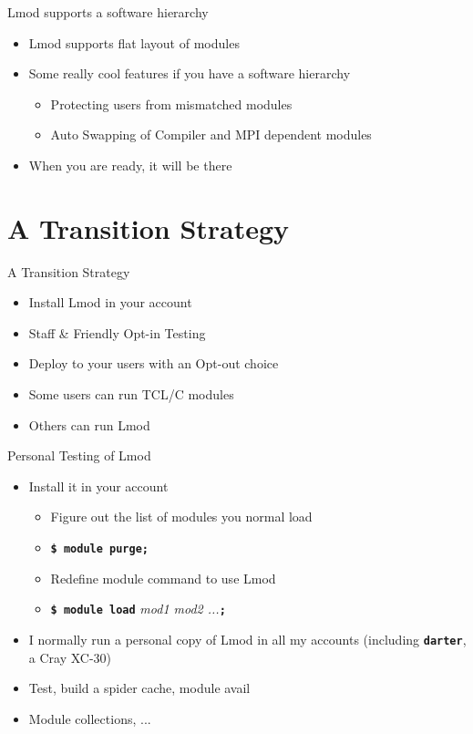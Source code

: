 \documentclass{beamer}
\begin{document}
\begin{frame}{Lmod supports a software hierarchy}
  \begin{itemize}
    \item Lmod supports flat layout of modules
    \item Some really cool features if you have a software hierarchy
      \begin{itemize}
        \item Protecting users from mismatched modules
        \item Auto Swapping of Compiler and MPI dependent modules
      \end{itemize}
    \item When you are ready, it will be there
  \end{itemize}
\end{frame}

\section{A Transition Strategy}

\begin{frame}{A Transition Strategy}
  \begin{itemize}
    \item Install Lmod in your account
    \item Staff \& Friendly Opt-in Testing
    \item Deploy to your users with an Opt-out choice
    \item Some users can run TCL/C modules
    \item Others can run Lmod
  \end{itemize}
\end{frame}

\begin{frame}{Personal Testing of Lmod}
  \begin{itemize}
    \item Install it in your account
      \begin{itemize}
        \item Figure out the list of modules you normal load
        \item \texttt{\bf \$ module purge;}
        \item Redefine module command to use Lmod
        \item \texttt{\bf \$ module load} \emph{mod1 mod2 ...}\texttt{\bf ;}
      \end{itemize}
    \item I normally run a personal copy of Lmod in all my accounts
      (including \texttt{\bf darter}, a Cray XC-30)
    \item Test, build a spider cache, module avail
    \item Module collections, ...
  \end{itemize}
\end{frame}
\end{document}
